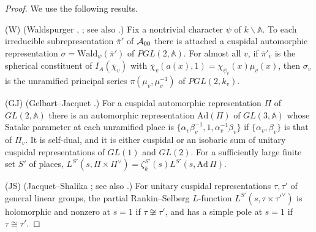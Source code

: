 \documentclass[12pt,letterpaper,openany]{book}
\theoremstyle{plain}
\theoremstyle{definition}
\theoremstyle{remark}
\theoremstyle{remark}
\begin{document}
\begin{proof}
We use the following results.

(W) (Waldspurger \cite{Wa1}, \cite{Wa2}; see also \cite{PS}.) Fix a
nontrivial character $\psi$ of $k\backslash{\mathbb A}$. To each
irreducible subrepresentation $\overline\pi'$ of ${\cal A}_{00}$ there is
attached a cuspidal automorphic representation
$\sigma=\mathrm{Wald}_\psi(\overline\pi')$ of $PGL(2,{\mathbb A})$. For
almost all $v$, if $\overline\pi'_v$ is the spherical constituent of
$I_A(\overline\chi_v)$ with
$\overline\chi_v(a(x),1)=\chi_{\psi_v}(x)\mu_v(x)$, then $\sigma_v$ is the
unramified principal series $\pi(\mu_v,\mu_v^{-1})$ of $PGL(2,k_v)$.

(GJ) (Gelbart--Jacquet \cite{GJ78}.) For a cuspidal automorphic
representation $\Pi$ of $GL(2,{\mathbb A})$ there is an automorphic
representation $\mathrm{Ad}(\Pi)$ of $GL(3,{\mathbb A})$ whose Satake
parameter at each unramified place is
$\{\alpha_v\beta_v^{-1},1,\alpha_v^{-1}\beta_v\}$ if $\{\alpha_v,\beta_v\}$
is that of $\Pi_v$. It is self-dual, and it is either cuspidal or an
isobaric sum of unitary cuspidal representations of $GL(1)$ and $GL(2)$.
For a sufficiently large finite set $S'$ of places,
$L^{S'}(s,\Pi\times\Pi^\vee)=\zeta_k^{S'}(s)L^{S'}(s,\mathrm{Ad}\,\Pi)$.

(JS) (Jacquet--Shalika \cite{JS}; see also \cite{Sha}.) For unitary
cuspidal representations $\tau,\tau'$ of general linear groups, the
partial Rankin--Selberg $L$-function $L^{S'}(s,\tau\times\tau'^\vee)$ is
holomorphic and nonzero at $s=1$ if $\tau\not\cong\tau'$, and has a simple
pole at $s=1$ if $\tau\cong\tau'$.


\end{proof}
\end{document}
